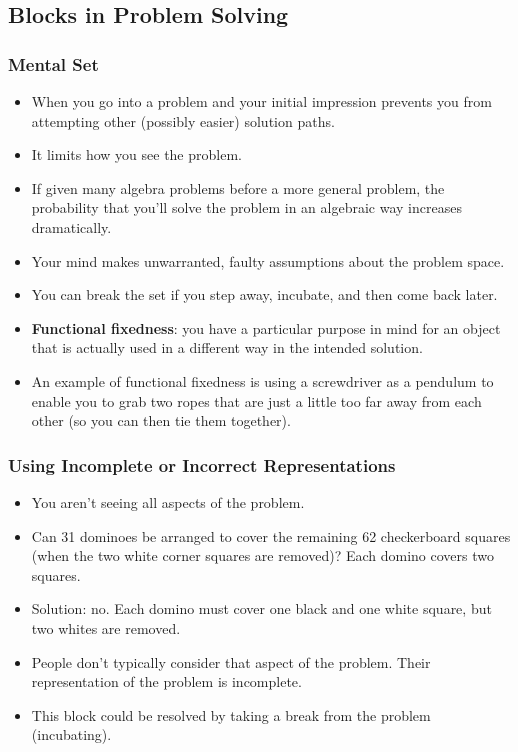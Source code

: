 \documentclass[]{article}
\begin{document}
		\subsection{Blocks in Problem Solving}
			\subsubsection{Mental Set}
				\begin{itemize}
					\item When you go into a problem and your initial impression prevents you from attempting other (possibly easier) solution paths.
					\item It limits how you see the problem.
					\item If given many algebra problems before a more general problem, the probability that you'll solve the problem in an algebraic way increases dramatically.
					\item Your mind makes unwarranted, faulty assumptions about the problem space.
					\item You can break the set if you step away, incubate, and then come back later.
					\item \textbf{Functional fixedness}: you have a particular purpose in mind for an object that is actually used in a different way in the intended solution.
					\item An example of functional fixedness is using a screwdriver as a pendulum to enable you to grab two ropes that are just a little too far away from each other (so you can then tie them together).
				\end{itemize}

			\subsubsection{Using Incomplete or Incorrect Representations}
				\begin{itemize}
					\item You aren't seeing all aspects of the problem.
					\item Can 31 dominoes be arranged to cover the remaining 62 checkerboard squares (when the two white corner squares are removed)? Each domino covers two squares.
					\item Solution: no. Each domino must cover one black and one white square, but two whites are removed.
					\item People don't typically consider that aspect of the problem. Their representation of the problem is incomplete.
					\item This block could be resolved by taking a break from the problem (incubating).
				\end{itemize}
\end{document}
